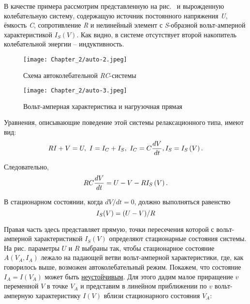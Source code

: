 В качестве примера рассмотрим представленную на рис.~ и  вырожденную колебательную систему, содержащую источник постоянного напряжения \emph{U}, ёмкость \emph{C}, сопротивление \emph{R} и нелинейный элемент с \emph{S}-образной вольт-амперной характеристикой $I_S(V)$. Как видно, в системе отсутствует второй накопитель колебательной энергии -- индуктивность.

\begin{figure}
	\centering
	\texttt{[image: Chapter\_2/auto-2.jpeg]}
	\caption{Схема автоколебательной \emph{RC}-системы}
\end{figure}

\begin{figure}
	\centering
	\texttt{[image: Chapter\_2/auto-3.jpeg]}
	\caption{Вольт-амперная характеристика и нагрузочная прямая}						
\end{figure}


Уравнения, описывающие поведение этой системы релаксационного типа,
имеют вид:
\begin{equation} 
	\eqmark{auto-4}
	RI+V=U,~ I=I_C+I_S,~ I_C=C\frac{dV}{dt}, I_S=I_S\left( V \right). 
\end{equation}

Следовательно,
\begin{equation} 
	\eqmark{auto-5}
	RC\frac{dV}{dt}=U-V-R{{I}_{S}}\left( V \right).
\end{equation}

В стационарном состоянии, когда $dV / dt = 0$, должно выполняться равенство
\begin{equation}
	\eqmark{auto-6}
	I_S(V)=(U-V)/R 
\end{equation}

Правая часть здесь представляет  прямую, точки пересечения которой с вольт-амперной характеристикой ${{I}_{S}}\left( V \right)$ определяют стационарные состояния системы. На рис.  параметры $U$ и $R$ выбраны так, чтобы стационарное состояние $A(V_A, I_A)$ лежало на падающей ветви вольт-амперной характеристики, где, как говорилось выше, возможен
автоколебательный режим. Покажем, что состояние $I_A=I(V_A)$ может быть \underline{неустойчивым}. Для этого дадим малое приращение $v$ переменной $V$ в точке
$V_A$ и представим в линейном приближении по $v$ вольт-амперную характеристику $I(V)$ вблизи стационарного состояния $V_A$:

